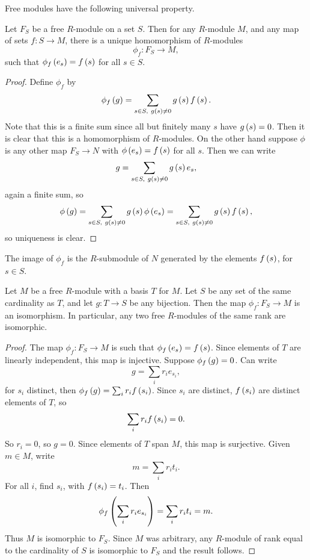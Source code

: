 \pagebreak

Free modules have the following universal property.

\begin{proposition}
Let $ F_S $ be a free $ R $-module on a set $ S $. Then for any $ R $-module $ M $, and any map of sets $ f : S \to M $, there is a unique homomorphism of $ R $-modules
$$ \phi_f : F_S \to M, $$
such that $ \phi_f\br{e_s} = f\br{s} $ for all $ s \in S $.
\end{proposition}

\begin{proof}
Define $ \phi_f $ by
$$ \phi_f\br{g} = \sum_{s \in S, \ g\br{s} \ne 0} g\br{s}f\br{s}. $$
Note that this is a finite sum since all but finitely many $ s $ have $ g\br{s} = 0 $. Then it is clear that this is a homomorphism of $ R $-modules. On the other hand suppose $ \phi $ is any other map $ F_S \to N $ with $ \phi\br{e_s} = f\br{s} $ for all $ s $. Then we can write
$$ g = \sum_{s \in S, \ g\br{s} \ne 0} g\br{s}e_s, $$
again a finite sum, so
$$ \phi\br{g} = \sum_{s \in S, \ g\br{s} \ne 0} g\br{s}\phi\br{e_s} = \sum_{s \in S, \ g\br{s} \ne 0} g\br{s}f\br{s}, $$
so uniqueness is clear.
\end{proof}

The image of $ \phi_f $ is the $ R $-submodule of $ N $ generated by the elements $ f\br{s} $, for $ s \in S $.

\begin{corollary}
Let $ M $ be a free $ R $-module with a basis $ T $ for $ M $. Let $ S $ be any set of the same cardinality as $ T $, and let $ g : T \to S $ be any bijection. Then the map $ \phi_f : F_S \to M $ is an isomorphism. In particular, any two free $ R $-modules of the same rank are isomorphic.
\end{corollary}

\begin{proof}
The map $ \phi_f : F_S \to M $ is such that $ \phi_f\br{e_s} = f\br{s} $. Since elements of $ T $ are linearly independent, this map is injective. Suppose $ \phi_f\br{g} = 0 $. Can write
$$ g = \sum_i r_ie_{s_i}, $$
for $ s_i $ distinct, then $ \phi_f\br{g} = \sum_i r_if\br{s_i} $. Since $ s_i $ are distinct, $ f\br{s_i} $ are distinct elements of $ T $, so
$$ \sum_i r_if\br{s_i} = 0. $$
So $ r_i = 0 $, so $ g = 0 $. Since elements of $ T $ span $ M $, this map is surjective. Given $ m \in M $, write
$$ m = \sum_i r_it_i. $$
For all $ i $, find $ s_i $, with $ f\br{s_i} = t_i $. Then
$$ \phi_f\br{\sum_i r_ie_{s_i}} = \sum_i r_it_i = m. $$
Thus $ M $ is isomorphic to $ F_S $. Since $ M $ was arbitrary, any $ R $-module of rank equal to the cardinality of $ S $ is isomorphic to $ F_S $ and the result follows.
\end{proof}


